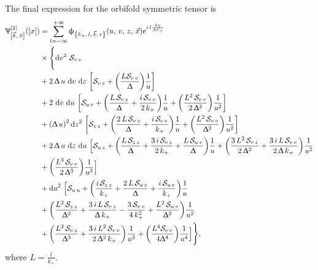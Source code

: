 The final expression for the orbifold symmetric tensor is
\begin{equation}
  \begin{split}
    \Psi^{[2]}_{\qty[\vec{k},\, S]}\qty(\qty[x])
    & =
    \infinfsum{l}
    \phi_{\kmkr}\qty(u,\, v,\, z,\, \vec{x})    
    e^{i\, l \frac{k_2}{\Delta k_+}}
    \\
    & \times
    \Biggl\lbrace
      \dss[2]{v}\, \cS_{v\, v}
      \\
      & +
      2\, \Delta\, u\, \dd{v}\, \dd{z}\,
      \qty[%
        \cS_{v\,z}
        +
        \qty(\frac{L \cS_{v\,v}}{\Delta})
        \frac{1}{u}
      ]
      \\
      & +
      2\, \dd{v}\, \dd{u}\,
      \qty[%
        \cS_{u\,v}
        +
        \qty(\frac{L\, \cS_{v\,z}}{\Delta} + \frac{i\, \cS_{v\,v}}{2\, k_{+}})
        \frac{1}{u}
        +
        \qty(\frac{L^2\, \cS_{v\,v}}{2\, \Delta^2})
        \frac{1}{u^2}
      ]
      \\
      & +
      \qty(\Delta\, u)^2 \dd{z}^2\,
      \qty[%
        \cS_{z\,z}
        +
        \qty(\frac{2\, L\, \cS_{v\,z}}{\Delta} + \frac{i\, \cS_{v\,v}}{k_{+}})
        \frac{1}{u}
        +
        \qty(\frac{L^2\, \cS_{v\,v}}{\Delta^2})
        \frac{1}{u^2}
      ]
      \\
      & +
      2\, \Delta\, u\, \dd{z}\, \dd{u}\,
      \Bigl[%
        \cS_{u\,z}
        +
        \qty(%
          \frac{L\, \cS_{z\,z}}{\Delta}
          +
          \frac{3\, i\, \cS_{v\,z}}{2\, k_{+}}
          +
          \frac{L\, \cS_{u\,v}}{\Delta}
        )
        \frac{1}{u}
        +
        \qty(%
          \frac{3\, L^2\, \cS_{v\,z}}{2\, \Delta^2}
          +
          \frac{3\, i\, L\, \cS_{v\,v}}{2\, \Delta\, k_{+}}
        )
        \frac{1}{u^2}
        \\
        & +
        \qty(\frac{L^3\,\cS_{v\,v}}{2\,\Delta^3})
        \frac{1}{u^3}
      \Bigr]
      \\
      & +
      \dd{u}^2\,
      \Bigl[
        \cS_{u\,u}
        +
        \qty(%
          \frac{i\, \cS_{z\,z}}{k_{+}}
          +
          \frac{2\, L\, \cS_{u\,z}}{\Delta}
          +
          \frac{i\, \cS_{u\,v}}{k_{+}}
        )
        \frac{1}{u}
        \\
        & +
        \qty(%
          \frac{L^2\, \cS_{z\,z}}{\Delta^2}
          +
          \frac{3\, i\, L\, \cS_{v\,z}}{\Delta\, k_{+}}
          -
          \frac{3\, \cS_{v\,v}}{4\, k_{+}^2}
          +
          \frac{L^2\, \cS_{u\,v}}{\Delta^2}
        )
        \frac{1}{u^2}
        \\
        & +
        \qty(%
          \frac{L^3\, \cS_{v\,z}}{\Delta^3}
          +
          \frac{3\, i\, L^2\, \cS_{v\,v}}{2\, \Delta^2\, k_{+}}
        )
        \frac{1}{u^3}
        +
        \qty(\frac{L^4 \cS_{v\,v}}{4 \Delta^4})
        \frac{1}{u^4}
      \Bigr]
    \Biggr\rbrace,
  \end{split}
\end{equation}
where $L = \frac{l}{k_+}$.


